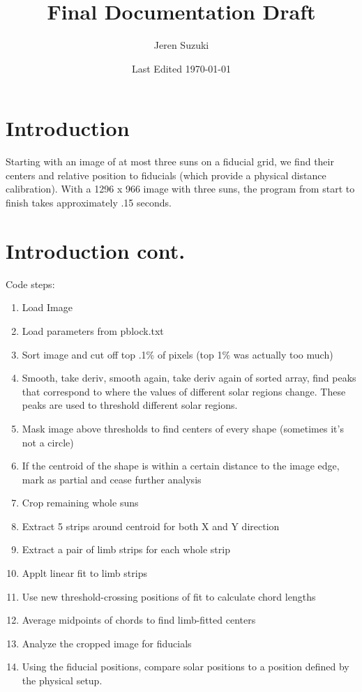 \documentclass[10pt]{scrartcl}
\title{Final Documentation Draft}
\author{Jeren Suzuki}
\date{Last Edited \today}
\begin{document}
\maketitle
{}
\tableofcontents
\clearpage
{}

\section{Introduction} %
\label{sec:introduction}
Starting with an image of at most three suns on a fiducial grid, we find their centers and relative position to fiducials (which provide a physical distance calibration). With a 1296 x 966 image with three suns, the program from start to finish takes approximately .15 seconds.

\section{Introduction cont.} %
\label{sec:intro_cont}

%
%
%
%
%
Code steps:

\begin{enumerate}
    \item Load Image
    \item Load parameters from pblock.txt
    \item Sort image and cut off top .1\% of pixels (top 1\% was actually too much)
    \item Smooth, take deriv, smooth again, take deriv again of sorted array, find peaks that correspond to where the values of different solar regions change. These peaks are used to threshold different solar regions.
    \item Mask image above thresholds to find centers of every shape (sometimes it's not a circle)
    \item If the centroid of the shape is within a certain distance to the image edge, mark as partial and cease further analysis
    \item Crop remaining whole suns
    \item Extract 5 strips around centroid for both X and Y direction
    \item Extract a pair of limb strips for each whole strip
    \item Applt linear fit to limb strips
    \item Use new threshold-crossing positions of fit to calculate chord lengths
    \item Average midpoints of chords to find limb-fitted centers
    \item Analyze the cropped image for fiducials
    \item Using the fiducial positions, compare solar positions to a position defined by the physical setup.
\end{enumerate}
\end{document}
